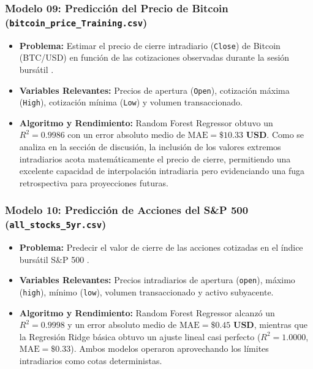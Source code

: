 \documentclass[12pt,letterpaper]{article}
\begin{document}
\subsubsection{Modelo 09: Predicción del Precio de Bitcoin (\texttt{bitcoin\_price\_Training.csv})}
\begin{itemize}[leftmargin=*]
    \item \textbf{Problema:} Estimar el precio de cierre intradiario (\texttt{Close}) de Bitcoin (BTC/USD) en función de las cotizaciones observadas durante la sesión bursátil \cite{jiang2021crypto}.
    \item \textbf{Variables Relevantes:} Precios de apertura (\texttt{Open}), cotización máxima (\texttt{High}), cotización mínima (\texttt{Low}) y volumen transaccionado.
    \item \textbf{Algoritmo y Rendimiento:} Random Forest Regressor obtuvo un $R^2 = \mathbf{0.9986}$ con un error absoluto medio de $\text{MAE} = \mathbf{\$10.33\text{ USD}}$. Como se analiza en la sección de discusión, la inclusión de los valores extremos intradiarios acota matemáticamente el precio de cierre, permitiendo una excelente capacidad de interpolación intradiaria pero evidenciando una fuga retrospectiva para proyecciones futuras.
\end{itemize}

\subsubsection{Modelo 10: Predicción de Acciones del S\&P 500 (\texttt{all\_stocks\_5yr.csv})}
\begin{itemize}[leftmargin=*]
    \item \textbf{Problema:} Predecir el valor de cierre de las acciones cotizadas en el índice bursátil S\&P 500 \cite{fischer2018deep}.
    \item \textbf{Variables Relevantes:} Precios intradiarios de apertura (\texttt{open}), máximo (\texttt{high}), mínimo (\texttt{low}), volumen transaccionado y activo subyacente.
    \item \textbf{Algoritmo y Rendimiento:} Random Forest Regressor alcanzó un $R^2 = \mathbf{0.9998}$ y un error absoluto medio de $\text{MAE} = \mathbf{\$0.45\text{ USD}}$, mientras que la Regresión Ridge básica obtuvo un ajuste lineal casi perfecto ($R^2 = 1.0000$, $\text{MAE} = \$0.33$). Ambos modelos operaron aprovechando los límites intradiarios como cotas deterministas.
\end{itemize}
\end{document}

